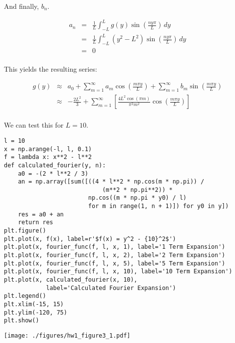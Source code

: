 \documentclass[10pt]{article}
\begin{document}
\begin{easylist}[enumerate]
    And finally, $b_n$.

    \begin{align*}
        a_n &=& \frac{1}{L} \int_{-L}^L g(y) \sin \left( \frac{n y \pi}{L} \right) \, dy\\
        &=& \frac{1}{L} \int_{-L}^L (y^2 - L^2) \sin \left( \frac{n y \pi}{L} \right) \, dy\\
        &=& 0\\
    \end{align*}

    This yields the resulting series:

    \begin{align*}
        g(y) &\approx& a_0 +
            \sum_{m=1}^\infty a_m \cos \left( \frac{m \pi y}{L} \right) +
            \sum_{m=1}^\infty b_m \sin \left( \frac{m \pi y}{L} \right)\\
        &\approx& -\frac{2 L^2}{3} + \sum_{m=1}^\infty \left[ \frac{4 L^2 \cos (\pi  m)}{\pi^2 m^2} \cos \left( \frac{m \pi y}{L} \right) \right]\\
    \end{align*}

    We can test this for $L=10$.\\

\hfill\begin{minipage}{\dimexpr\textwidth-1cm}

\begin{verbatim}
l = 10
x = np.arange(-l, l, 0.1)
f = lambda x: x**2 - l**2
def calculated_fourier(y, n):
    a0 = -(2 * l**2 / 3)
    an = np.array([sum([((4 * l**2 * np.cos(m * np.pi)) /
                            (m**2 * np.pi**2)) *
                        np.cos((m * np.pi * y0) / l)
                        for m in range(1, n + 1)]) for y0 in y])
    res = a0 + an
    return res
plt.figure()
plt.plot(x, f(x), label=r'$f(x) = y^2 - {10}^2$')
plt.plot(x, fourier_func(f, l, x, 1), label='1 Term Expansion')
plt.plot(x, fourier_func(f, l, x, 2), label='2 Term Expansion')
plt.plot(x, fourier_func(f, l, x, 5), label='5 Term Expansion')
plt.plot(x, fourier_func(f, l, x, 10), label='10 Term Expansion')
plt.plot(x, calculated_fourier(x, 10),
            label='Calculated Fourier Expansion')
plt.legend()
plt.xlim(-15, 15)
plt.ylim(-120, 75)
plt.show()
\end{verbatim}
\texttt{[image: ./figures/hw1\_figure3\_1.pdf]}

\xdef\tpd{\the\prevdepth}
\end{minipage}\\


\end{easylist}
\end{document}

